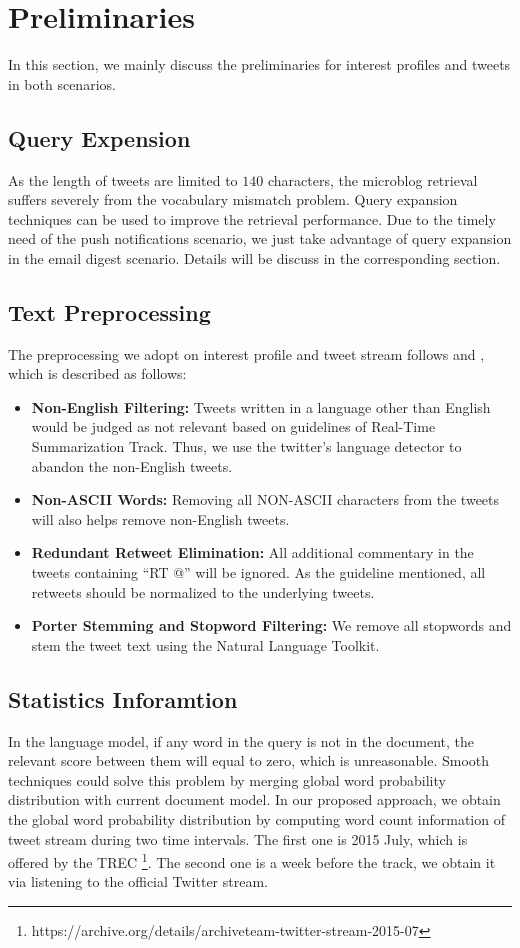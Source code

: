 \section{Preliminaries}
In this section, we mainly discuss the preliminaries for interest profiles and tweets in both scenarios.

\subsection{Query Expension}
As the length of tweets are limited to $140$ characters, the microblog retrieval
suffers severely from the vocabulary mismatch problem.
Query expansion techniques\cite{zhai2011mbfb} can be used to improve the retrieval performance.
Due to the timely need of the push notifications scenario,
we just take advantage of query expansion in the email digest scenario.
Details will be discuss in the corresponding section.

\subsection{Text Preprocessing}
The preprocessing we adopt on interest profile and tweet stream follows \cite{qiangpkuicst} and \cite{lvpkuicst},
which is described as follows:
\begin{itemize}
\item \textbf{Non-English Filtering:}
Tweets written in a language other than English would be judged as not relevant
based on guidelines of Real-Time Summarization Track.
Thus, we use the twitter's language detector to abandon the non-English tweets.
\item \textbf{Non-ASCII Words:}
Removing all NON-ASCII characters from the tweets will also helps remove non-English tweets.
\item \textbf{Redundant Retweet Elimination:}
All additional commentary in the tweets containing ``RT @'' will be ignored.
As the guideline mentioned, all retweets should be normalized to the underlying tweets.
\item \textbf{Porter Stemming and Stopword Filtering:}
We remove all stopwords and stem the tweet text using the Natural Language Toolkit.
\end{itemize}

\subsection{Statistics Inforamtion}
In the language model, if any word in the query is not in the document,
the relevant score between them will equal to zero, which is unreasonable.
Smooth techniques could solve this problem by merging global word
probability distribution with current document model.
In our proposed approach, we obtain the global word probability distribution
by computing word count information of tweet stream during two time intervals.
The first one is 2015 July, which is offered by the TREC
\footnote{https://archive.org/details/archiveteam-twitter-stream-2015-07}.
The second one is a week before the track, we obtain it via listening to
the official Twitter stream.
